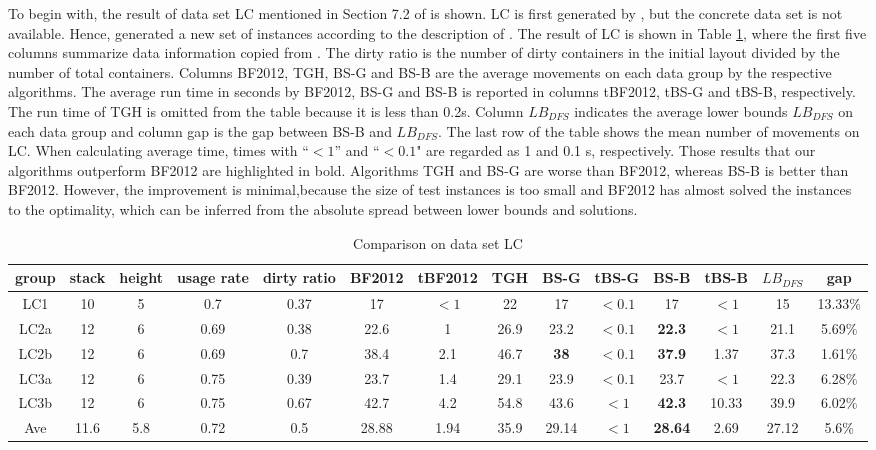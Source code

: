 \documentclass[review,3p,times,authoryear,12pt]{elsarticle}
\begin{document}
To begin with, the result of data set LC mentioned in Section 7.2 of \cite{BF2012} is shown. 
LC is first generated by \cite{Lee2009}, but the concrete data set is not available. 
Hence, \cite{BF2012} generated a new set of instances according to the description of \cite{Lee2009}. 
The result of LC is shown in Table \ref{tab:lc}, where the first five columns summarize data information copied from \cite{BF2012}. 
The dirty ratio is the number of dirty containers in the initial layout divided by the number of total containers.
Columns BF2012, TGH, BS-G and BS-B are the average movements on each data group by the respective algorithms. 
The average run time in seconds by BF2012, BS-G and BS-B is reported in columns tBF2012, tBS-G and tBS-B, respectively. 
The run time of TGH is omitted from the table because it is less than 0.2s. 
Column $\mathit{LB}_\mathit{DFS}$ indicates the average lower bounds $\mathit{LB}_\mathit{DFS}$ on each data group and column gap is the gap between BS-B and $\mathit{LB}_\mathit{DFS}$. 
The last row of the table shows the mean number of movements on LC. 
When calculating average time, times with ``$<1$''  and ``$<0.1$" are regarded as 1 and 0.1 s, respectively. 
Those results that our algorithms outperform BF2012 are highlighted in bold. 
Algorithms TGH and BS-G are worse than BF2012, whereas BS-B is better than BF2012. 
However, the improvement is minimal,because the size of test instances is too small and BF2012 has almost solved the instances to the optimality, which can be inferred from the absolute spread between lower bounds and solutions.

\begin{table}[!htb]
\scriptsize
\centering
  \caption{\label{tab:lc} Comparison on data set LC}
    \begin{tabular}{c|c|c|c|c|c|c|c|c|c|c|c|c|c}

    \hline
    group & stack & height & usage rate & dirty ratio & BF2012 & tBF2012 & TGH   & BS-G  & tBS-G & BS-B  & tBS-B & $\mathit{LB}_\mathit{DFS}$ & gap\\
    \hline
    LC1   & 10   & 5  & 0.7  & 0.37 & 17   & $<1$ & 22   & 17         & $<0.1$ & 17             & $<1$  & 15 & 13.33\%\\
    LC2a  & 12   & 6  & 0.69 & 0.38 & 22.6 & 1    & 26.9 & 23.2       & $<0.1$ & \textbf{22.3}  & $<1$  & 21.1 & 5.69\%\\
    LC2b  & 12   & 6  & 0.69 & 0.7  & 38.4 & 2.1  & 46.7 & \textbf{38}& $<0.1$ & \textbf{37.9}  & 1.37  & 37.3 & 1.61\%\\
    LC3a  & 12   & 6  & 0.75 & 0.39 & 23.7 & 1.4  & 29.1 & 23.9       & $<0.1$ & 23.7           & $<1$  & 22.3 & 6.28\%\\
    LC3b  & 12   & 6  & 0.75 & 0.67 & 42.7 & 4.2  & 54.8 & 43.6       & $<1$   & \textbf{42.3}  & 10.33 & 39.9 & 6.02\%\\
    \hline
    Ave   & 11.6 & 5.8& 0.72 & 0.5  & 28.88& 1.94 & 35.9 & 29.14      & $<1$   & \textbf{28.64} & 2.69  & 27.12&
    5.6\% \\
    \hline
    \end{tabular}%
\end{table}%
\end{document}
